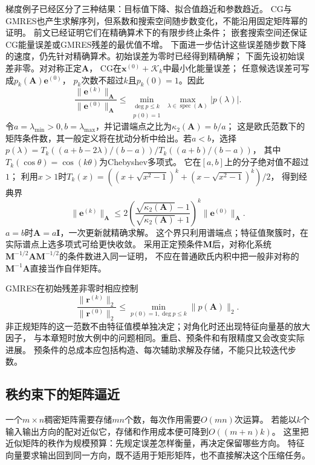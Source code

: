 梯度例子已经区分了三种结果：目标值下降、拟合值趋近和参数趋近。
CG与GMRES也产生求解序列，但系数和搜索空间随步数变化，不能沿用固定矩阵幂的证明。
前文已经证明它们在精确算术下的有限步终止条件；
嵌套搜索空间还保证CG能量误差或GMRES残差的最优值不增。
下面进一步估计这些误差随步数下降的速度，仍先针对精确算术。初始误差为零时已经得到精确解；
下面先设初始误差非零。对对称正定$\bm A$，
CG在$\bm x^{(0)}+\mathcal K_k$中最小化能量误差；
任意候选误差可写成$p_k(\bm A)\bm e^{(0)}$，
$p_k$次数不超过$k$且$p_k(0)=1$。因此
\[
 \frac{\lVert\bm e^{(k)}\rVert_{\bm A}}{\lVert\bm e^{(0)}\rVert_{\bm A}}
 \leq\min_{\substack{\deg p\leq k\\p(0)=1}}
        \max_{\lambda\in\operatorname{spec}(\bm A)}|p(\lambda)|.
\]
令$a=\lambda_{\min}>0,b=\lambda_{\max}$，并记谱端点之比为$\kappa_2(\bm A)=b/a$；
这是欧氏范数下的矩阵条件数，其一般定义将在扰动分析中给出。若$a<b$，选择
$p(\lambda)=T_k((a+b-2\lambda)/(b-a))/T_k((a+b)/(b-a))$，
其中$T_k(\cos\theta)=\cos(k\theta)$为Chebyshev多项式。
它在$[a,b]$上的分子绝对值不超过$1$；
利用$x>1$时$T_k(x)=((x+\sqrt{x^2-1})^k+(x-\sqrt{x^2-1})^k)/2$，
得到经典界
\begin{equation}
 \lVert\bm e^{(k)}\rVert_{\bm A}
 \leq2\left(\frac{\sqrt{\kappa_2(\bm A)}-1}
                 {\sqrt{\kappa_2(\bm A)}+1}\right)^k
       \lVert\bm e^{(0)}\rVert_{\bm A}.
 \label{eq:ch06-cg-condition-bound}
\end{equation}
$a=b$时$\bm A=a\bm I$，一次更新就精确求解。
这个界只利用谱端点；特征值聚簇时，在实际谱点上选多项式可给更快收敛。
采用正定预条件$\bm M$后，对称化系统
$\bm M^{-1/2}\bm A\bm M^{-1/2}$的条件数进入同一证明，
不应在普通欧氏内积中把一般非对称的$\bm M^{-1}\bm A$直接当作自伴矩阵。

GMRES在初始残差非零时相应控制
\[
\frac{\lVert\bm r^{(k)}\rVert_2}{\lVert\bm r^{(0)}\rVert_2}
\leq\min_{p(0)=1,\deg p\leq k}\lVert p(\bm A)\rVert_2.
\]
非正规矩阵的这一范数不由特征值模单独决定；对角化时还出现特征向量基的放大因子，
与本章短时放大例中的问题相同。重启、预条件和有限精度又会改变实际进展。
预条件的总成本应包括构造、每次辅助求解及存储，不能只比较迭代步数。

\subsection{秩约束下的矩阵逼近}
\label{sec:matrix-analysis-svd-low-rank}
\label{sec:ch06-rank-constrained-approximation}
\label{sec:ch06-error-constrained-rank}

一个$m\times n$稠密矩阵需要存储$mn$个数，每次作用需要$O(mn)$次运算。
若能以$k$个输入输出方向的配对近似它，存储和作用成本便可降到$O((m+n)k)$。
这里把近似矩阵的秩作为规模预算：先规定误差怎样衡量，再决定保留哪些方向。
特征向量要求输出回到同一方向，既不适用于矩形矩阵，也不直接解决这个压缩任务。

